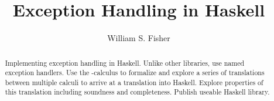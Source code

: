 \documentclass[11pt,a4paper,draft]{report}
\title{Exception Handling in Haskell}
\author{William S. Fisher}
\begin{document}
\maketitle
\begin{abstract}
Implementing exception handling in Haskell. Unlike other libraries, use named exception handlers. Use the \ltry-calculus to formalize and explore a series of translations between multiple calculi to arrive at a translation into Haskell. Explore properties of this translation including soundness and completeness. Publish useable Haskell library.
\end{abstract}



\tableofcontents







\newpage


\end{document}

